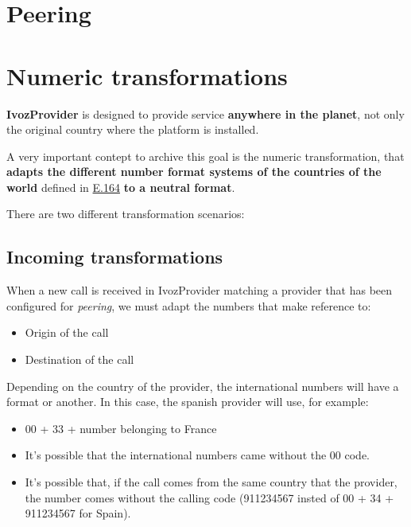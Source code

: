 \documentclass[letterpaper,10pt,english]{sphinxmanual}
\begin{document}
\section{Peering}
\label{brand/peering/index:peering}\label{brand/peering/index::doc}

\section{Numeric transformations}
\label{brand/transformations/index::doc}\label{brand/transformations/index:transformations}\label{brand/transformations/index:numeric-transformations}
\textbf{IvozProvider} is designed to provide service \textbf{anywhere in the planet}, not
only the original country where the platform is installed.

A very important contept to archive this goal is the numeric transformation,
that \textbf{adapts the different number format systems of the countries of the world}
defined in \href{https://www.itu.int/rec/T-REC-E.164/es}{E.164} \textbf{to a neutral format}.

There are two different transformation scenarios:


\subsection{Incoming transformations}
\label{brand/transformations/index:incoming-transformations}
When a new call is received in IvozProvider matching a provider that has been
configured for \emph{peering}, we must adapt the numbers that make reference to:
\begin{itemize}
\item {} 
Origin of the call

\item {} 
Destination of the call

\end{itemize}

Depending on the country of the provider, the international numbers will have
a format or another. In this case, the spanish provider will use, for example:
\begin{itemize}
\item {} 
00 + 33 + number belonging to France

\item {} 
It's possible that the international numbers came without the 00 code.

\item {} 
It's possible that, if the call comes from the same country that the provider,
the number comes without the calling code (911234567 insted of 00 + 34 +
911234567 for Spain).

\end{itemize}
\end{document}
